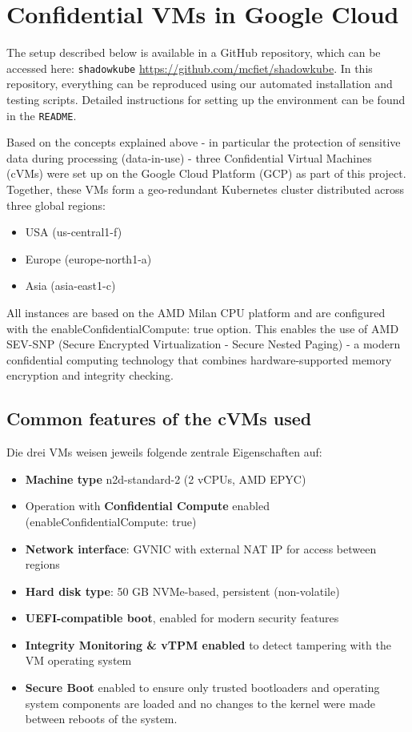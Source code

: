 \section{Confidential VMs in Google Cloud}

The setup described below is available in a GitHub repository, which can be accessed here: \texttt{shadowkube} \url{https://github.com/mcfiet/shadowkube}. In this repository, everything can be reproduced using our automated installation and testing scripts. Detailed instructions for setting up the environment can be found in the \texttt{README}.

Based on the concepts explained above - in particular the protection of sensitive data during processing (data-in-use) - three Confidential Virtual Machines (cVMs) were set up on the Google Cloud Platform (GCP) as part of this project. Together, these VMs form a geo-redundant Kubernetes cluster distributed across three global regions:

\begin{itemize}
  \item USA (us-central1-f)
  \item Europe (europe-north1-a)
  \item Asia (asia-east1-c)
\end{itemize}

All instances are based on the AMD Milan CPU platform and are configured with the enableConfidentialCompute: true option. This enables the use of AMD SEV-SNP (Secure Encrypted Virtualization - Secure Nested Paging) - a modern confidential computing technology that combines hardware-supported memory encryption and integrity checking.

\subsection{Common features of the cVMs used}

Die drei VMs weisen jeweils folgende zentrale Eigenschaften auf:

\begin{itemize}
  \item \textbf{Machine type} n2d-standard-2 (2 vCPUs, AMD EPYC)
\item Operation with \textbf{Confidential Compute} enabled (enableConfidentialCompute: true)
\item \textbf{Network interface}: GVNIC with external NAT IP for access between regions
\item \textbf{Hard disk type}: 50 GB NVMe-based, persistent (non-volatile)  
\item \textbf{UEFI-compatible boot}, enabled for modern security features
\item \textbf{Integrity Monitoring \& vTPM enabled} to detect tampering with the VM operating system
\item \textbf{Secure Boot} enabled to ensure only trusted bootloaders and operating system components are loaded and no changes to the kernel were made between reboots of the system.
\end{itemize}

